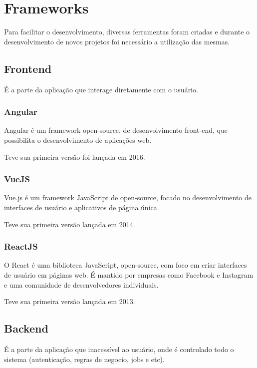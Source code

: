 \section{Frameworks}

Para facilitar o desenvolvimento, diversas ferramentas foram criadas e durante o desenvolvimento de novos projetos foi necessário a utilização das mesmas.

\subsection{Frontend}

É a parte da aplicação que interage diretamente com o usuário.

\subsubsection{Angular}

Angular é um framework open-source, de desenvolvimento front-end, que possibilita o desenvolvimento de aplicações web.

Teve sua primeira versão foi lançada em 2016.

\subsubsection{VueJS}

Vue.js é um framework JavaScript de open-source, focado no desenvolvimento de interfaces de usuário e aplicativos de página única.

Teve sua primeira versão lançada em 2014.

\subsubsection{ReactJS}

O React é uma biblioteca JavaScript, open-source, com foco em criar interfaces de usuário em páginas web. É mantido por empresas como Facebook e Instagram e uma comunidade de desenvolvedores individuais. 

Teve sua primeira versão lançada em 2013.

\subsection{Backend}

É a parte da aplicação que inacessível ao usuário, onde é controlado todo o sistema (autenticação, regras de negocio, jobs e etc).

